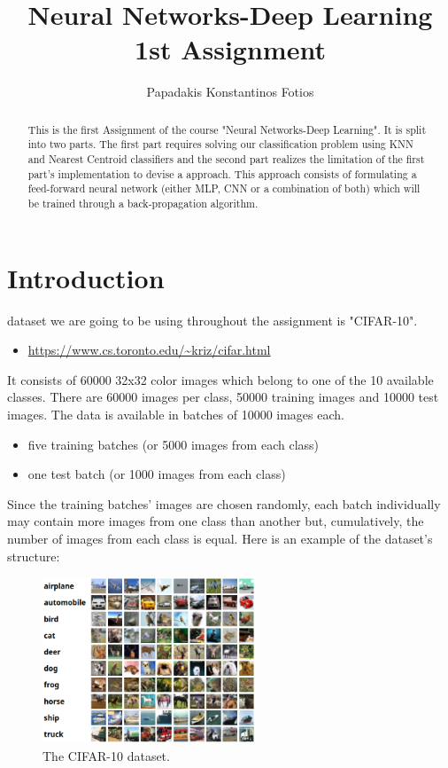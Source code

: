 \documentclass[lettersize,journal]{IEEEtran}
\begin{document}
\title{Neural Networks-Deep Learning \\ 1st Assignment}
\author{Papadakis Konstantinos Fotios}
\maketitle

\begin{abstract}
This is the first Assignment of the course "Neural Networks-Deep Learning". It is split into two parts.
The first part requires solving our classification problem using KNN and Nearest Centroid classifiers and 
the second part realizes the limitation of the first part's implementation to devise a approach. This 
approach consists of formulating a feed-forward neural network (either MLP, CNN or a combination of both)
which will be trained through a back-propagation algorithm.
\end{abstract}

\section{Introduction}

 dataset we are going to be using throughout the assignment is "CIFAR-10".
\begin{itemize}
  \item \url{https://www.cs.toronto.edu/~kriz/cifar.html}
\end{itemize}

It consists of 60000 32x32 color images which belong to one of the 10 available classes. There are 
60000 images per class, 50000 training images and 10000 test images. The data is available in batches of 
10000 images each.
\begin{itemize}
  \item five training batches (or 5000 images from each class)
  \item one test batch (or 1000 images from each class)
\end{itemize}
Since the training batches' images are chosen randomly, each batch individually may contain more images 
from one class than another but, cumulatively, the number of images from each class is equal. 
Here is an example of the dataset's structure:

\begin{figure}[H]
  \centering
  \includegraphics[width=2.5in]{cifar10_example.png}
  \caption{The CIFAR-10 dataset.}
  \label{CIFAR example}
\end{figure}
\end{document}
